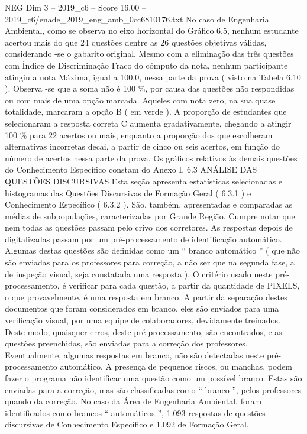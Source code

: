 \begin{textsample}{NEG Dim 3 – 2019\_c6 – Score 16.00 – 2019\_c6/enade\_2019\_eng\_amb\_0cc6810176.txt}
No caso de Engenharia Ambiental, como se observa no eixo horizontal do Gráfico 6.5, nenhum estudante acertou mais do que 24 questões dentre as 26 questões objetivas válidas, considerando -se o gabarito original.
Mesmo com a eliminação das três questões com Índice de Discriminação Fraco do cômputo da nota, nenhum participante atingiu a nota Máxima, igual a 100,0, nessa parte da prova ( visto na Tabela 6.10 ).
Observa -se que a soma não é 100 \%, por causa das questões não respondidas ou com mais de uma opção marcada.
Aqueles com nota zero, na sua quase totalidade, marcaram a opção B ( em verde ).
A proporção de estudantes que selecionaram a resposta correta C aumenta gradativamente, chegando a atingir 100 \% para 22 acertos ou mais, enquanto a proporção dos que escolheram alternativas incorretas decai, a partir de cinco ou seis acertos, em função do número de acertos nessa parte da prova.
Os gráficos relativos às demais questões do Conhecimento Específico constam do Anexo I. 6.3 ANÁLISE DAS QUESTÕES DISCURSIVAS Esta seção apresenta estatísticas selecionadas e histogramas das Questões Discursivas de Formação Geral ( 6.3.1 ) e Conhecimento Específico ( 6.3.2 ).
São, também, apresentadas e comparadas as médias de subpopulações, caracterizadas por Grande Região.
Cumpre notar que nem todas as questões passam pelo crivo dos corretores.
As respostas depois de digitalizadas passam por um pré-processamento de identificação automático.
Algumas destas questões são definidas como um “ branco automático ” ( que não são enviadas para os professores para correção, a não ser que na segunda fase, a de inspeção visual, seja constatada uma resposta ).
O critério usado neste pré-processamento, é verificar para cada questão, a partir da quantidade de PIXELS, o que provavelmente, é uma resposta em branco.
A partir da separação destes documentos que foram considerados em branco, eles são enviados para uma verificação visual, por uma equipe de colaboradores, devidamente treinados.
Deste modo, quaisquer erros, deste pré-processamento, são encontrados, e as questões preenchidas, são enviadas para a correção dos professores.
Eventualmente, algumas respostas em branco, não são detectadas neste pré-processamento automático.
A presença de pequenos riscos, ou manchas, podem fazer o programa não identificar uma questão como um possível branco.
Estas são enviadas para a correção, mas são classificadas como “ branco ”, pelos professores quando da correção.
No caso da Área de Engenharia Ambiental, foram identificados como brancos “ automáticos ”, 1.093 respostas de questões discursivas de Conhecimento Específico e 1.092 de Formação Geral.

\end{textsample}
